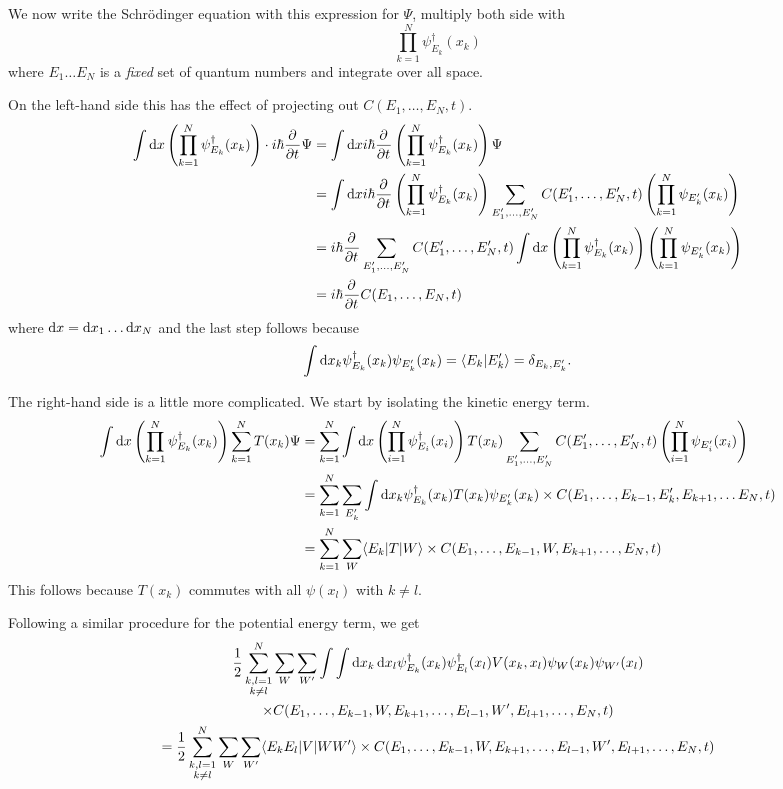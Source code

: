 We now write the Schrödinger equation with this expression for $\Psi$, multiply both side with 
\[ \prod_{k=1}^N \psi^\dagger_{E_k}(x_k) \]
where $E_1\ldots E_N$ is a \textit{fixed} set of quantum numbers and integrate over all space.

On the left-hand side this has the effect of projecting out $C(E_1, \ldots, E_N,t)$.
\begin{align*}
 \int \operatorname{d \!}{x} \left (\prod_{k=1}^N \psi^\dagger_{E_k}(x_k) \right) \cdot i\hbar  \frac{\partial{^{}}}{\partial{{t}^{}}} \Psi &= \int \operatorname{d \!}{x} i\hbar  \frac{\partial{^{}}}{\partial{{t}^{}}}  \left (\prod_{k=1}^N \psi^\dagger_{E_k}(x_k) \right)\Psi \\
&= \int \operatorname{d \!}{x} i\hbar  \frac{\partial{^{}}}{\partial{{t}^{}}}  \left (\prod_{k=1}^N \psi^\dagger_{E_k}(x_k) \right) \sum_{E'_1, \ldots, E'_N}C(E'_1, \ldots, E'_N,t)\left (\prod_{k=1}^N \psi_{E'_k}(x_k) \right) \\
&=  i\hbar  \frac{\partial{^{}}}{\partial{{t}^{}}} \sum_{E'_1, \ldots, E'_N}C(E'_1, \ldots, E'_N,t) \int \operatorname{d \!}{x} \left (\prod_{k=1}^N \psi^\dagger_{E_k}(x_k) \right) \left (\prod_{k=1}^N \psi_{E'_k}(x_k) \right) \\
&= i\hbar  \frac{\partial{^{}}}{\partial{{t}^{}}}  C(E_1, \ldots, E_N,t)
\end{align*}
where $\operatorname{d \!}{x} = \operatorname{d \!}{x_1}\ldots \operatorname{d \!}{x_N}$ and the last step follows because
\[ \int \diff{x_{k}} \psi^\dagger_{E_k}(x_k)\psi_{E'_k}(x_k) = \braket{E_k}{E'_k} = \delta_{E_k,E'_k}.\]

The right-hand side is a little more complicated. We start by isolating the kinetic energy term.
\begin{align*}
\int \diff{x} \left (\prod_{k=1}^N \psi^\dagger_{E_k}(x_k) \right)\sum^N_{k=1}T(x_k) \Psi &= \sum^N_{k=1} \int \diff{x} \left (\prod_{i=1}^N \psi^\dagger_{E_i}(x_i) \right) T(x_k) \sum_{E'_1, \ldots, E'_N}C(E'_1, \ldots, E'_N,t)\left (\prod_{i=1}^N \psi_{E'_i}(x_i) \right) \\
&= \sum^N_{k=1} \sum_{E'_k} \int \diff{x_k} \psi^\dagger_{E_k}(x_k) T(x_k) \psi_{E'_k}(x_k) \times C(E_1, \ldots, E_{k-1}, E'_{k}, E_{k+1}, \ldots E_N,t) \\
&= \sum^N_{k=1} \sum_{W} \braket[T]{E_k}{W} \times C(E_1, \ldots, E_{k-1}, W, E_{k+1}, \ldots, E_N,t)
\end{align*}
This follows because $T(x_k)$ commutes with all $\psi(x_l)$ with $k\neq l$.

Following a similar procedure for the potential energy term, we get
\begin{multline*}
\frac{1}{2}\sum^N_{\substack{k,l=1 \\ k \neq l}} \sum_W \sum_{W'} \int\int \diff{x_k}\diff{x_l} \psi_{E_k}^\dagger(x_k)\psi_{E_l}^\dagger(x_l) V(x_k,x_l)\psi_W(x_k)\psi_{W'}(x_l) \\ \times C(E_1, \ldots, E_{k-1}, W, E_{k+1}, \ldots, E_{l-1},W',E_{l+1}, \ldots, E_N,t) \\
= \frac{1}{2}\sum^N_{\substack{k,l=1 \\ k \neq l}} \sum_W \sum_{W'} \braket[V]{E_kE_l}{WW'} \times C(E_1, \ldots, E_{k-1}, W, E_{k+1}, \ldots, E_{l-1},W',E_{l+1}, \ldots, E_N,t)
\end{multline*}


